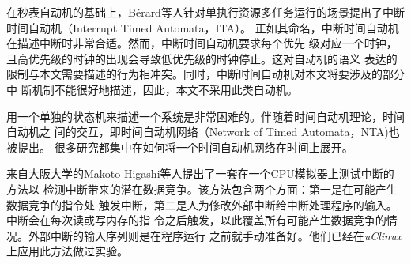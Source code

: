 在秒表自动机的基础上，B{\'e}rard等人针对单执行资源多任务运行的场景提出了中断
时间自动机（Interrupt Timed Automata，ITA）。\cite{Berard:2012:ITA:2158996.2159045}
正如其命名，中断时间自动机在描述中断时非常合适。然而，中断时间自动机要求每个优先
级对应一个时钟，且高优先级的时钟的出现会导致低优先级的时钟停止。这对自动机的语义
表达的限制与本文需要描述的行为相冲突。同时，中断时间自动机对本文将要涉及的部分中
断机制不能很好地描述，因此，本文不采用此类自动机。

用一个单独的状态机来描述一个系统是非常困难的。伴随着时间自动机理论，时间自动机之
间的交互，即时间自动机网络（Network of Timed Automata，NTA)也被提出。
\cite{Alur:1994:TTA:180782.180519}\cite{Bouyer06timedunfoldings}
很多研究都集中在如何将一个时间自动机网络在时间上展开。\cite{Bouyer06timedunfoldings}


来自大阪大学的Makoto Higashi等人提出了一套在一个CPU模拟器上测试中断的方法以
检测中断带来的潜在数据竞争。该方法包含两个方面：第一是在可能产生数据竞争的指令处
触发中断，第二是人为修改外部中断给中断处理程序的输入。中断会在每次读或写内存的指
令之后触发，以此覆盖所有可能产生数据竞争的情况。外部中断的输入序列则是在程序运行
之前就手动准备好。他们已经在\emph{uClinux}上应用此方法做过实验。\cite{Higashi:2010:EMC:1808266.1808278}

